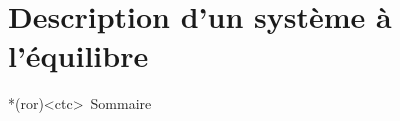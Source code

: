 \documentclass[../../main/main.tex]{subfiles}
\begin{document}
\setcounter{chapter}{6}


\chapter{Description d'un système à l'équilibre}


\begin{tcn}*(ror)<ctc>{\iconsomm~Sommaire}
	\vspace{-15pt}
	\minitoc
	\vspace{-25pt}
\end{tcn}

\end{document}
